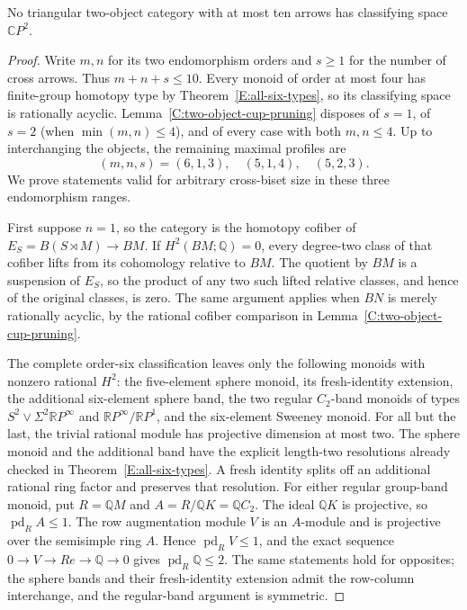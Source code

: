 \begin{lemma}
\label{C:small-triangular-vertices}
No triangular two-object category with at most ten arrows has
classifying space $\mathbb CP^2$.
\end{lemma}
\begin{proof}
Write $m,n$ for its two endomorphism orders and $s\geq1$ for the
number of cross arrows. Thus $m+n+s\leq10$. Every monoid of order
at most four has finite-group homotopy type by
Theorem~\ref{E:all-six-types}, so its classifying space is rationally
acyclic. Lemma~\ref{C:two-object-cup-pruning} disposes of $s=1$,
of $s=2$ (when $\min(m,n)\leq4$), and of every case with both
$m,n\leq4$. Up to interchanging the objects, the remaining maximal
profiles are
\[
 (m,n,s)=(6,1,3),\quad(5,1,4),\quad(5,2,3).
\]
We prove statements valid for arbitrary cross-biset size in these
three endomorphism ranges.

First suppose $n=1$, so the category is the homotopy cofiber of
$E_S=B(S\rtimes M)\to BM$. If $H^2(BM;\mathbb Q)=0$, every
degree-two class of that cofiber lifts from its cohomology relative
to $BM$. The quotient by $BM$ is a suspension of $E_S$, so the
product of any two such lifted relative classes, and hence of the
original classes, is zero. The same argument applies when $BN$ is
merely rationally acyclic, by the rational cofiber comparison in
Lemma~\ref{C:two-object-cup-pruning}.

The complete order-six classification leaves only the following
monoids with nonzero rational $H^2$: the five-element sphere monoid,
its fresh-identity extension, the additional six-element sphere band,
the two regular $C_2$-band monoids of types
$S^2\vee\Sigma^2\mathbb RP^\infty$ and
$\mathbb RP^\infty/\mathbb RP^1$, and the six-element Sweeney monoid.
For all but the last, the trivial rational module has projective
dimension at most two. The sphere monoid and the additional band have
the explicit length-two resolutions already checked in
Theorem~\ref{E:all-six-types}. A fresh identity splits off an additional
rational ring factor and preserves that resolution. For either regular
group-band monoid, put $R=\mathbb QM$ and
$A=R/\mathbb QK=\mathbb QC_2$. The ideal $\mathbb QK$ is projective,
so $\operatorname{pd}_R A\leq1$. The row augmentation module $V$ is
an $A$-module and is projective over the semisimple ring $A$.
Hence $\operatorname{pd}_R V\leq1$, and the exact sequence
$0\to V\to Re\to\mathbb Q\to0$ gives
$\operatorname{pd}_R\mathbb Q\leq2$. The same statements hold for
opposites; the sphere bands and their fresh-identity extension admit
the row-column interchange, and the regular-band argument is symmetric.


\end{proof}
